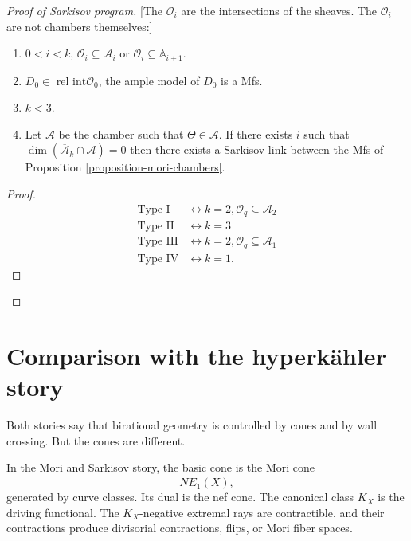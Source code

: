 \begin{proof}[Proof of Sarkisov program]
[The $\mathcal{O}_i$ are the intersections of
the sheaves.
The $\mathcal{O}_i$ are not chambers
themselves:]

\begin{proposition}
\label{proposition-o-are-not-chambers}
 \begin{enumerate}
\item $0<i<k$, $\mathcal{O}_i \subseteq
\mathcal{A}_i$ or
$\mathcal{O}_i \subseteq \mathbb{A}_{i+1}$.

\item $D_0 \in \text{ rel int}\mathcal{O}_0$,
the ample model of $D_0$ is a Mfs.

\item $k<3$.

\item
Let $\mathcal{A}$ be the chamber such that
$\Theta \in \mathcal{A}$.
If there exists $i$ such that
$\dim(\overline{\mathcal{A}}_k \cap
\mathcal{A})=0$
then there exists a Sarkisov link between the
Mfs of Proposition
\ref{proposition-mori-chambers}.
\end{enumerate}
\end{proposition}

\begin{proof}
$$
\begin{aligned}
\text{Type I}
&\leftrightarrow k=2, \mathcal{O}_q
\subseteq \mathcal{A}_2\\
\text{Type II}&\leftrightarrow k=3\\
\text{Type III}&\leftrightarrow
k=2,\mathcal{O}_q \subseteq \mathcal{A}_1\\
\text{Type IV}&\leftrightarrow k=1.
\end{aligned}
$$
\end{proof}
\end{proof}






\section{Comparison with the hyperk\"ahler
story}
\label{section-comparison-hyperkahler}

\medskip\noindent
Both stories say that birational
geometry is controlled by cones and by
wall crossing.
But the cones are different.

\medskip\noindent
In the Mori and Sarkisov story, the
basic cone is the Mori cone
$$
\overline{NE}_1(X),
$$
generated by curve classes.
Its dual is the nef cone.
The canonical class $K_X$ is the
driving functional.
The $K_X$-negative extremal rays are
contractible, and their contractions
produce divisorial contractions,
flips, or Mori fiber spaces.


